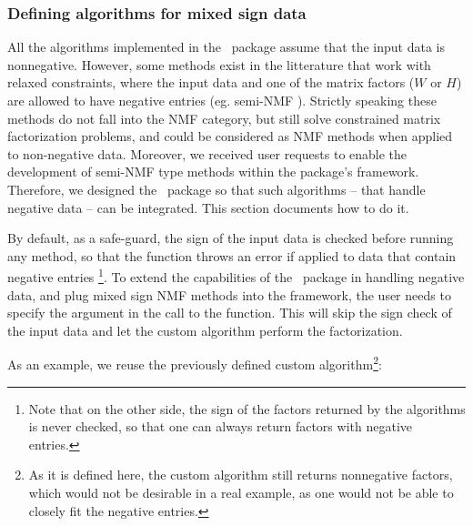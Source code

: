 \documentclass[a4paper]{article}
\newcommand{\nmfpack}{\code{NMF}\ }
\begin{document}
%
%

\subsubsection{Defining algorithms for mixed sign data}
All the algorithms implemented in the \nmfpack package assume that the input data is nonnegative.
However, some methods exist in the litterature that work with relaxed constraints, where 
the input data and one of the matrix factors ($W$ or $H$) are allowed to have negative 
entries (eg. semi-NMF \cite{Ding2008, Roux2008}).
Strictly speaking these methods do not fall into the NMF category, but still solve constrained matrix factorization 
problems, and could be considered as NMF methods when applied to non-negative data.
Moreover, we received user requests to enable the development of semi-NMF type methods within the package's framework.
Therefore, we designed the \nmfpack package so that such algorithms -- that handle negative data -- can be 
integrated. This section documents how to do it.

By default, as a safe-guard, the sign of the input data is checked before running any method, so that the 
 function throws an error if applied to data that contain negative entries
\footnote{Note that on the other side, the sign of the factors returned by the algorithms is never 
checked, so that one can always return factors with negative entries.}.
To extend the capabilities of the \nmfpack package in handling negative data, 
and plug mixed sign NMF methods into the framework, the user needs to specify the argument 
 in the call to the  function.
This will skip the sign check of the input data and let the custom algorithm perform the factorization.
 
As an example, we reuse the previously defined custom algorithm\footnote{As it is defined here, the custom 
algorithm still returns nonnegative factors, which would not be desirable in a real example, as one would not 
be able to closely fit the negative entries.}:
\end{document}
